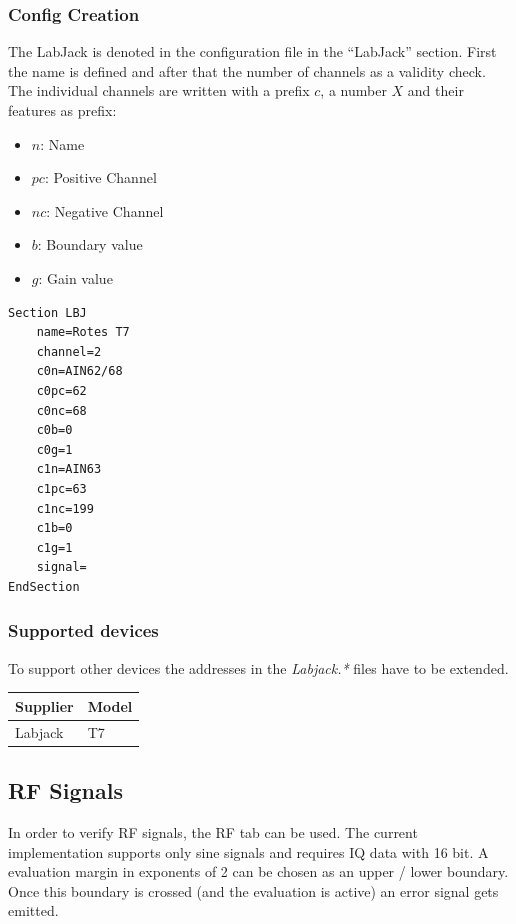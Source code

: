 \documentclass[10pt,a4paper]{article}
\begin{document}
	\subsubsection{Config Creation}	
	The LabJack is denoted in the configuration file in the \enquote{LabJack} section. First the name is defined and after that the number of channels as a validity check. The individual channels are written with a prefix $c$, a number $X$ and their features as prefix:
	
	\begin{itemize}
	\item $n$: Name
	\item $pc$: Positive Channel
	\item $nc$: Negative Channel
	\item $b$: Boundary value
	\item $g$: Gain value
	\end{itemize}
	
\begin{lstlisting}
Section LBJ
	name=Rotes T7
	channel=2
	c0n=AIN62/68
	c0pc=62
	c0nc=68
	c0b=0
	c0g=1
	c1n=AIN63
	c1pc=63
	c1nc=199
	c1b=0
	c1g=1
	signal=
EndSection
\end{lstlisting}
	
		\subsubsection{Supported devices}
		To support other devices the addresses in the \textit{Labjack.*} files have to be extended.
	
		\begin{table}[H]
		\centering
		\begin{tabular}{ll}
		\toprule
		Supplier			& Model \\ \midrule
		Labjack				& T7 \\
		\bottomrule
		\end{tabular}			
		\end{table}	

	\newpage
	\subsection{RF Signals}
	In order to verify RF signals, the RF tab can be used. The current implementation supports only sine signals and requires IQ data with 16 bit. A evaluation margin in exponents of 2 can be chosen as an upper / lower boundary. Once this boundary is crossed (and the evaluation is active) an error signal gets emitted.
		
\end{document}
